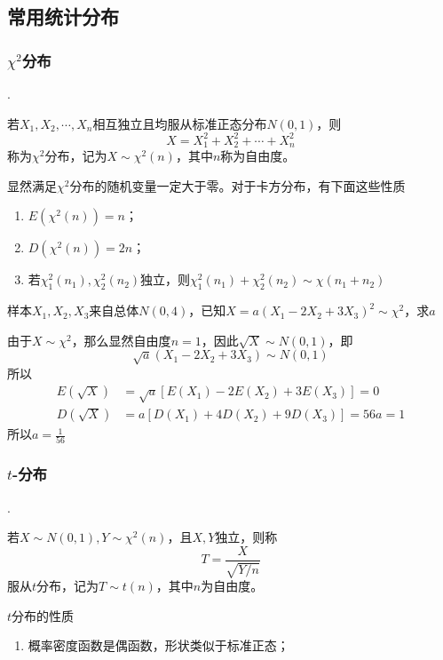 \subsection{常用统计分布}
\subsubsection{\texorpdfstring{$\chi^2$}{χ}分布}
.
\begin{definition}
    若$X_1,X_2,\cdots,X_n$相互独立且均服从标准正态分布$N(0,1)$，则
    \[ X = X_1^2 + X_2^2 + \cdots + X_n^2 \]
    称为$\chi^2$分布，记为$X\sim \chi^2(n)$，其中$n$称为自由度。
\end{definition}
显然满足$\chi^2$分布的随机变量一定大于零。对于卡方分布，有下面这些性质
\begin{enumerate}[(1)]
    \item $E\left(\chi^2(n)\right) = n$；
    \item $D\left(\chi^2(n)\right) = 2n$；
    \item 若$\chi_1^2(n_1), \chi_2^2(n_2)$独立，则$\chi_1^2(n_1) + \chi_2^2(n_2) \sim \chi(n_1+n_2)$
\end{enumerate}

\begin{example}
    样本$X_1,X_2,X_3$来自总体$N(0,4)$，已知$X=a(X_1-2X_2+3X_3)^2\sim \chi^2$，求$a$
\end{example}
\begin{solution}
    由于$X\sim \chi^2$，那么显然自由度$n=1$，因此$\sqrt{X}\sim N(0,1)$，即
    \[ \sqrt{a}(X_1-2X_2+3X_3) \sim N(0,1) \]
    所以
    \begin{align*}
        E(\sqrt{X}) & = \sqrt{a}\left[E(X_1)-2E(X_2)+3E(X_3)\right] = 0 \\
        D(\sqrt{X}) & = a\left[D(X_1)+4D(X_2)+9D(X_3)\right] = 56a = 1
    \end{align*}
    所以$a=\frac{1}{56}$
\end{solution}

\subsubsection{\texorpdfstring{$t$}{t}-分布}
.
\begin{definition}
    若$X\sim N(0,1), Y\sim\chi^2(n)$，且$X,Y$独立，则称
    \[ T = \frac{X}{\sqrt{Y/n}} \]
    服从$t$分布，记为$T\sim t(n)$，其中$n$为自由度。
\end{definition}
$t$分布的性质
\begin{enumerate}[(1)]
    \item 概率密度函数是偶函数，形状类似于标准正态；
\end{enumerate}

